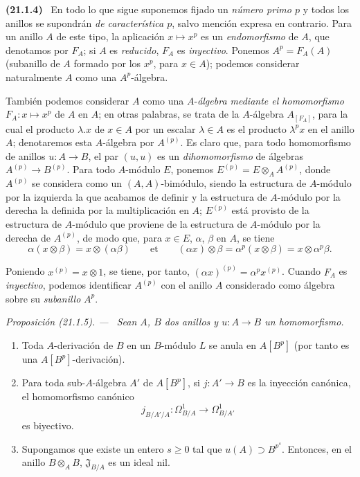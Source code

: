 \documentclass[10pt,oneside]{book}
\makeatletter
\newcommand{\setmanualcurrentlabel}[1]{\def\@currentlabel{#1}}
\newcommand{\oldpage}[2][]{%
  \setcounter{footnote}{0}%
  \marginpar{\scriptsize\textbf{#1}~|~#2}\ignorespaces}
\newenvironment{env}[1][]{\setmanualcurrentlabel{#1}\par\medskip\noindent\textbf{(#1)}\ }{\par}
\newenvironment{proposition}[1][]{%
  \setmanualcurrentlabel{#1}\par\medskip\noindent\itshape Proposición (#1). ---\ }{\par}
\makeatother
\begin{document}
\begin{env}[21.1.4]
\label{0.21.1.4-es}
En todo lo que sigue suponemos fijado un \emph{número primo $p$} y todos los anillos
se supondrán \emph{de característica $p$}, salvo mención expresa en contrario. Para
un anillo $A$ de este tipo, la aplicación $x\mapsto x^p$ es un \emph{endomorfismo} de
$A$, que denotamos por $F_A$; si $A$ es \emph{reducido}, $F_A$ es \emph{inyectivo}. Ponemos
$A^p=F_A(A)$ (subanillo de $A$ formado por los $x^p$, para $x\in A$); podemos
considerar naturalmente $A$ como una $A^p$-álgebra.

También podemos considerar $A$ como una $A$-\emph{álgebra mediante el homomorfismo}
$F_A:x\mapsto x^p$ de $A$ en $A$; en otras palabras, se trata de la $A$-álgebra
$A_{[F_A]}$, para la cual el producto $\lambda.x$ de $x\in A$ por un
escalar $\lambda\in A$ es el producto $\lambda^p x$ en el anillo $A$; denotaremos esta $A$-álgebra por $A^{(p)}$. Es
claro que, para todo homomorfismo de anillos $u:A\to B$, el par $(u,u)$ es un
\emph{dihomomorfismo} de álgebras $A^{(p)}\to B^{(p)}$.
Para todo $A$-módulo $E$, ponemos $E^{(p)}=E\otimes_A A^{(p)}$, donde
$A^{(p)}$ se considera como un $(A,A)$-bimódulo, siendo la estructura de
$A$-módulo por la izquierda la que acabamos de definir y la estructura de
$A$-módulo por la derecha la definida por la multiplicación en $A$; $E^{(p)}$ está provisto de la estructura de $A$-módulo que proviene de la estructura de $A$-módulo por la derecha de $A^{(p)}$, de modo que,
para $x\in E$, $\alpha$, $\beta$ en $A$, se tiene
\[
  \alpha(x\otimes\beta)=x\otimes(\alpha\beta)\qquad\text{et}\qquad
  (\alpha x)\otimes\beta=\alpha^p(x\otimes\beta)=x\otimes\alpha^p\beta.
\]
\end{env}

\oldpage[0\textsubscript{IV-1}]{155}
Poniendo $x^{(p)}=x\otimes1$, se tiene, por tanto,
$(\alpha x)^{(p)}=\alpha^p x^{(p)}$. Cuando $F_A$ es \emph{inyectivo}, podemos
identificar $A^{(p)}$ con el anillo $A$ considerado como álgebra sobre su
\emph{subanillo} $A^p$.

\begin{proposition}[21.1.5]
\label{0.21.1.5-es}
Sean $A$, $B$ dos anillos y $u:A\to B$ un homomorfismo.
\begin{enumerate}
  \item[\textup{(i)}] Toda $A$-derivación de $B$ en un $B$-módulo $L$ se anula en
  $A[B^p]$ (por tanto es una $A[B^p]$-derivación).
  \item[\textup{(ii)}] Para toda sub-$A$-álgebra $A'$ de $A[B^p]$, si
  $j:A'\to B$ es la inyección canónica, el homomorfismo canónico
  \[
  j_{B/A'/A}:\Omega^1_{B/A}\longrightarrow\Omega^1_{B/A'}
  \]
  es biyectivo.
  \item[\textup{(iii)}] Supongamos que existe un entero $s\geq0$ tal que
  $u(A)\supset B^{p^s}$. Entonces, en el anillo $B\otimes_A B$,
  $\mathfrak J_{B/A}$ es un ideal nil.
\end{enumerate}
\end{proposition}
\end{document}
